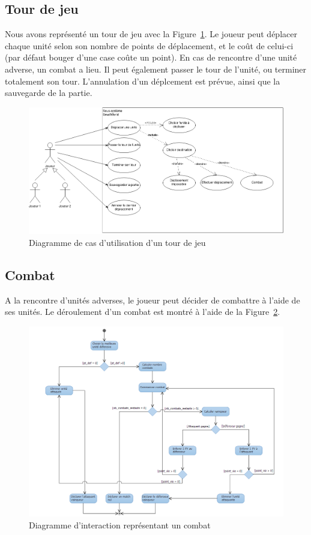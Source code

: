 \documentclass[a4paper]{article}
\begin{document}
	\subsection{Tour de jeu}
Nous avons représenté un tour de jeu avec la Figure~\ref{fig:tour}. Le joueur peut déplacer chaque unité selon son nombre de points de déplacement, et le coût de celui-ci (par défaut bouger d'une case coûte un point). En cas de rencontre d'une unité adverse, un combat a lieu. Il peut également passer le tour de l'unité, ou terminer totalement son tour. L'annulation d'un déplcement est prévue, ainsi que la sauvegarde de la partie.

\begin{figure}[ht]
\centering
	\includegraphics[width=1\textwidth]{../Schemas/CU_Tour.png}
		\caption{Diagramme de cas d'utilisation d'un tour de jeu}
		\label{fig:tour}
\end{figure}

	\newpage\subsection{Combat}
 A la rencontre d'unités adverses, le joueur peut décider de combattre à l'aide de ses unités. Le déroulement d'un combat est montré à l'aide de la Figure~\ref{fig:interaction_combat}.
\begin{figure}[ht]
\centering
	\includegraphics[width=1\textwidth, height=0.4\textheight]{../Schemas/Interaction_Combat.png}
		\caption{Diagramme d'interaction représentant un combat}
		\label{fig:interaction_combat}
\end{figure}
\end{document}
